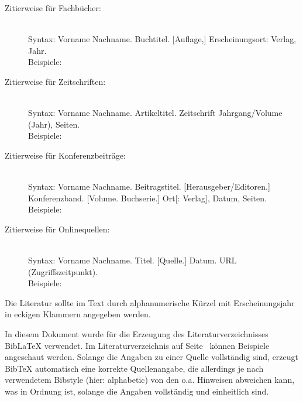 \documentclass[
    fontsize=12pt,
    headings=small,
    parskip=half,           %
    bibliography=totoc,
    numbers=noenddot,       %
    open=any,               %
    ]{scrreprt}
\begin{document}
\begin{description}

	\item[Zitierweise für Fachbücher:] \mbox{}\\[1ex]
	Syntax: Vorname Nachname. Buchtitel. {[}Auflage,{]} Erscheinungsort: Verlag, Jahr. \\[1ex]
	Beispiele: \cite{Beut2009,ScWe2007,Pfit90}

	\item[Zitierweise für Zeitschriften:] \mbox{}\\[1ex]
	Syntax: Vorname Nachname. Artikeltitel. Zeitschrift Jahrgang/Volume (Jahr), Seiten. \\[1ex]
	Beispiele: \cite{Kili2006,Lamp1981,ThKZ2002,Chau81,Chau88}

	\item[Zitierweise für Konferenzbeiträge:] \mbox{}\\[1ex]
    Syntax: Vorname Nachname. Beitragstitel. {[}Herausgeber/Editoren.{]}
    Konferenzband. {[}Volume. Buchserie.{]} Ort{[: Verlag]}, Datum, Seiten. \\[1ex]
	Beispiele: \cite{InBr2009,WWPK2010,HSFN2009,GoRS99,WaMS2008}

	\item[Zitierweise für Onlinequellen:] \mbox{}\\[1ex]
    Syntax: Vorname Nachname. Titel. {[}Quelle.{]} Datum. URL (Zugriffszeitpunkt). \\[1ex]
	Beispiele: \cite{CCC2009,Heise2011,textwahrnehmung}

\end{description}

Die Literatur sollte im Text durch alphanumerische Kürzel mit Erscheinungsjahr in eckigen Klammern angegeben werden.
%

In diesem Dokument wurde für die Erzeugung des Literaturverzeichnisses BibLaTeX verwendet. Im Literaturverzeichnis auf Seite~\pageref{sec:literaturverzeichnis} können Beispiele angeschaut werden. Solange die Angaben zu einer Quelle vollständig sind, erzeugt BibTeX automatisch eine korrekte Quellenangabe, die allerdings je nach verwendetem Bibstyle (hier: alphabetic) von den o.a. Hinweisen abweichen kann, was in Ordnung ist, solange die Angaben vollständig und einheitlich sind.
\end{document}
